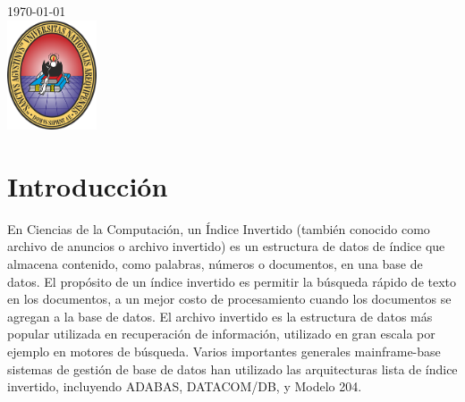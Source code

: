 \documentclass{article}
\begin{document}
\begin{titlepage}
	
	
	{\large \today}\\[2cm] %
	
	
	\includegraphics[width=100px, keepaspectratio]{img/unsa}\\[1cm] %
	
	
	\vfill %
	
\end{titlepage}	
	
	
	

	
	
\tableofcontents
\newpage	
	

	
		
	
\section{Introducción}
	
En ﻿Ciencias de la Computación﻿, un ﻿Índice Invertido ﻿(también conocido como ﻿archivo de anuncios ﻿o ﻿archivo invertido﻿) \cite{indice_invertido} es un ﻿estructura de datos de índice que ﻿almacena contenido, como palabras, números o documentos, en una base de datos﻿. El propósito de un índice invertido es permitir la ﻿búsqueda rápido de texto en los documentos﻿, a un mejor costo de procesamiento cuando los documentos se agregan a la base de datos. El archivo invertido es la estructura de datos más popular utilizada en ﻿recuperación de información, \cite{10.1145/296854.277632} ﻿utilizado en gran escala por ejemplo en ﻿motores de búsqueda﻿. Varios importantes generales ﻿mainframe﻿-base ﻿sistemas de gestión de base de datos ﻿han utilizado las arquitecturas lista de índice invertido, incluyendo ﻿ADABAS, ﻿DATACOM/DB﻿, y ﻿Modelo 204.
\end{document}
